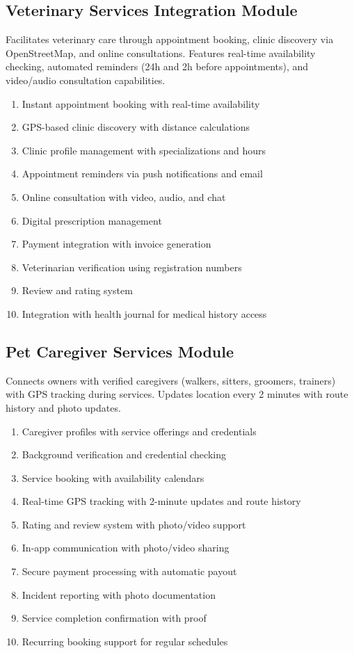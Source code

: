 \subsection{Veterinary Services Integration Module}
Facilitates veterinary care through appointment booking, clinic discovery via OpenStreetMap, and online consultations. Features real-time availability checking, automated reminders (24h and 2h before appointments), and video/audio consultation capabilities.
\begin{enumerate}
    \item Instant appointment booking with real-time availability
    \item GPS-based clinic discovery with distance calculations
    \item Clinic profile management with specializations and hours
    \item Appointment reminders via push notifications and email
    \item Online consultation with video, audio, and chat
    \item Digital prescription management
    \item Payment integration with invoice generation
    \item Veterinarian verification using registration numbers
    \item Review and rating system
    \item Integration with health journal for medical history access
\end{enumerate}

\subsection{Pet Caregiver Services Module}
Connects owners with verified caregivers (walkers, sitters, groomers, trainers) with GPS tracking during services. Updates location every 2 minutes with route history and photo updates.
\begin{enumerate}
    \item Caregiver profiles with service offerings and credentials
    \item Background verification and credential checking
    \item Service booking with availability calendars
    \item Real-time GPS tracking with 2-minute updates and route history
    \item Rating and review system with photo/video support
    \item In-app communication with photo/video sharing
    \item Secure payment processing with automatic payout
    \item Incident reporting with photo documentation
    \item Service completion confirmation with proof
    \item Recurring booking support for regular schedules
\end{enumerate}

